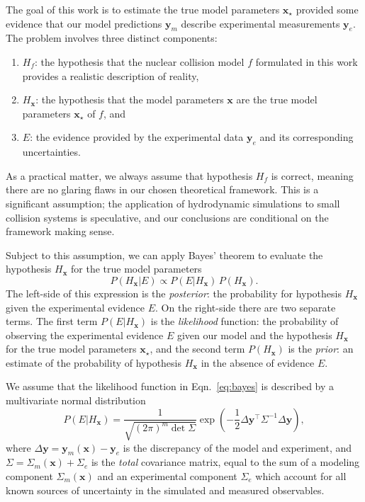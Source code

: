 \documentclass[aps,prc,reprint,amsmath,nofootinbib]{revtex4-1}
\newcommand{\x}{\mathbf{x}}
\newcommand{\y}{\mathbf{y}}
\begin{document}
The goal of this work is to estimate the true model parameters $\x_\star$ provided some evidence that our model predictions $\y_m$ describe experimental measurements $\y_e$.
The problem involves three distinct components:
\begin{enumerate}[itemsep=0pt, leftmargin=2\parindent]
  \item $H_f$: the hypothesis that the nuclear collision model $f$ formulated in this work provides a realistic description of reality,
  \item $H_\x$: the hypothesis that the model parameters $\x$ are the true model parameters $\x_\star$ of $f$, and
  \item $E$: the evidence provided by the experimental data $\y_e$ and its corresponding uncertainties.
\end{enumerate}
As a practical matter, we always assume that hypothesis $H_f$ is correct, meaning there are no glaring flaws in our chosen theoretical framework.
This is a significant assumption; the application of hydrodynamic simulations to small collision systems is speculative, and our conclusions are conditional on the framework making sense.

Subject to this assumption, we can apply Bayes' theorem to evaluate the hypothesis $H_\x$ for the true model parameters
\begin{equation}
  \label{eq:bayes}
  P(H_\x | E) \propto P(E | H_\x)\, P(H_\x).
\end{equation}
The left-side of this expression is the \emph{posterior}: the probability for hypothesis $H_\x$ given the experimental evidence $E$.
On the right-side there are two separate terms.
The first term $P(E | H_\x)$ is the \emph{likelihood} function: the probability of observing the experimental evidence $E$ given our model and the hypothesis $H_\x$ for the true model parameters $\x_\star$, and the second term $P(H_\x)$ is the \emph{prior}: an estimate of the probability of hypothesis $H_\x$ in the absence of evidence $E$.

We assume that the likelihood function in Eqn.~\eqref{eq:bayes} is described by a multivariate normal distribution
\begin{equation}
  \label{eq:likelihood}
  P(E | H_\x) = \frac{1}{\sqrt{(2\pi)^m \det \Sigma}} \exp \left ( -\frac{1}{2}\Delta\y^\intercal \Sigma^{-1} \Delta\y \right ),
\end{equation}
where $\Delta\y = \y_m(\x) - \y_e$ is the discrepancy of the model and experiment, and $\Sigma = \Sigma_m(\x) + \Sigma_e$ is the \emph{total} covariance matrix, equal to the sum of a modeling component $\Sigma_m(\x)$ and an experimental component $\Sigma_e$ which account for all known sources of uncertainty in the simulated and measured observables.
\end{document}
